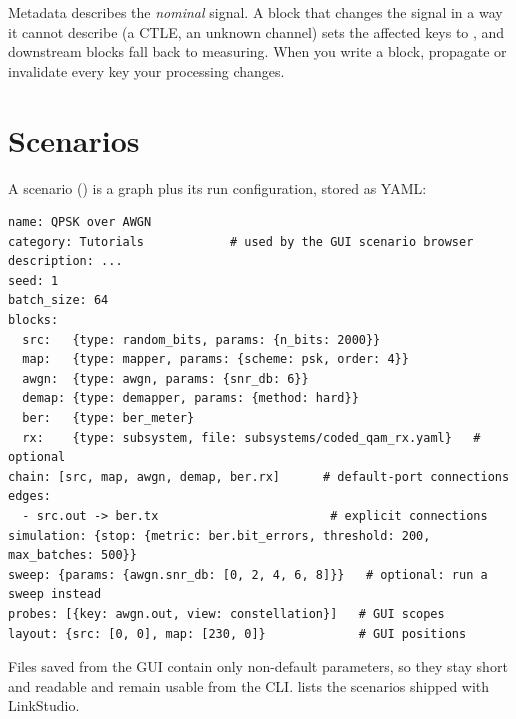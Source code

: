 \begin{pitfall}
Metadata describes the \emph{nominal} signal. A block that changes the signal in a way it
cannot describe (a CTLE, an unknown channel) sets the affected keys to , and
downstream blocks fall back to measuring. When you write a block, propagate or invalidate
every key your processing changes.
\end{pitfall}

\section{Scenarios}\label{sec:scenarios}
A scenario () is a graph plus its run configuration, stored as YAML:
\begin{lstlisting}[style=yaml]
name: QPSK over AWGN
category: Tutorials            # used by the GUI scenario browser
description: ...
seed: 1
batch_size: 64
blocks:
  src:   {type: random_bits, params: {n_bits: 2000}}
  map:   {type: mapper, params: {scheme: psk, order: 4}}
  awgn:  {type: awgn, params: {snr_db: 6}}
  demap: {type: demapper, params: {method: hard}}
  ber:   {type: ber_meter}
  rx:    {type: subsystem, file: subsystems/coded_qam_rx.yaml}   # optional
chain: [src, map, awgn, demap, ber.rx]      # default-port connections
edges:
  - src.out -> ber.tx                        # explicit connections
simulation: {stop: {metric: ber.bit_errors, threshold: 200, max_batches: 500}}
sweep: {params: {awgn.snr_db: [0, 2, 4, 6, 8]}}   # optional: run a sweep instead
probes: [{key: awgn.out, view: constellation}]   # GUI scopes
layout: {src: [0, 0], map: [230, 0]}             # GUI positions
\end{lstlisting}
Files saved from the GUI contain only non-default parameters, so they stay short and readable
and remain usable from the CLI.  lists the scenarios shipped with LinkStudio.
